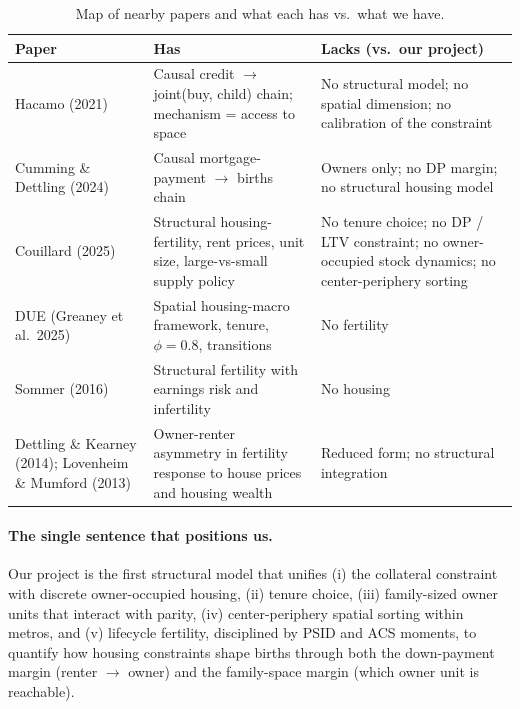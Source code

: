\documentclass[11pt]{article}
\begin{document}
\begin{table}[H]
\centering
\small
\caption{Map of nearby papers and what each has vs.\ what we have.}
\begin{tabular}{p{}p{}p{}}
\toprule
Paper & Has & Lacks (vs.\ our project) \\
\midrule
Hacamo (2021)
 & Causal credit $\to$ joint(buy, child) chain; mechanism = access to space
 & No structural model; no spatial dimension; no calibration of the constraint \\
Cumming \& Dettling (2024)
 & Causal mortgage-payment $\to$ births chain
 & Owners only; no DP margin; no structural housing model \\
Couillard (2025)
 & Structural housing-fertility, rent prices, unit size, large-vs-small supply policy
 & No tenure choice; no DP / LTV constraint; no owner-occupied stock dynamics; no center-periphery sorting \\
DUE (Greaney et al.\ 2025)
 & Spatial housing-macro framework, tenure, $\phi=0.8$, transitions
 & No fertility \\
Sommer (2016)
 & Structural fertility with earnings risk and infertility
 & No housing \\
Dettling \& Kearney (2014); Lovenheim \& Mumford (2013)
 & Owner-renter asymmetry in fertility response to house prices and housing wealth
 & Reduced form; no structural integration \\
\bottomrule
\end{tabular}
\end{table}

\paragraph{The single sentence that positions us.}
Our project is the first structural model that unifies (i) the collateral constraint with discrete owner-occupied housing, (ii) tenure choice, (iii) family-sized owner units that interact with parity, (iv) center-periphery spatial sorting within metros, and (v) lifecycle fertility, disciplined by PSID and ACS moments, to quantify how housing constraints shape births through both the down-payment margin (renter $\to$ owner) and the family-space margin (which owner unit is reachable).
\end{document}
